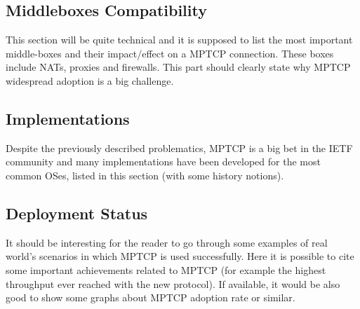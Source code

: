 \subsection{Middleboxes Compatibility}
This section will be quite technical and it is supposed to list the most important middle-boxes and their impact/effect on a MPTCP connection. These boxes include NATs, proxies and firewalls. This part should clearly state why MPTCP widespread adoption is a big challenge.

\subsection{Implementations}
Despite the previously described problematics, MPTCP is a big bet in the IETF community and many implementations have been developed for the most common OSes, listed in this section (with some history notions).

\subsection{Deployment Status}
It should be interesting for the reader to go through some examples of real world's scenarios in which MPTCP is used successfully. Here it is possible to cite some important achievements related to MPTCP (for example the highest throughput ever reached with the new protocol).
If available, it would be also good to show some graphs about MPTCP adoption rate or similar.